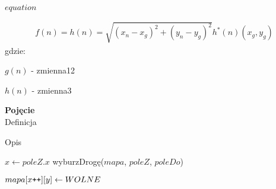 $equation$

\begin{gather}
 	f(n) = h(n) = \sqrt{(x_n - x_g)^2 + (y_n - y_g)^2} h^*(n) (x_g, y_g)
 	\label{eq_astar} 
\end{gather}
 gdzie:

 $g(n)$ - zmienna12

 $h(n)$ - zmienna3

\begin{definition}{\bf Pojęcie\\}
	Definicja
\end{definition}

\begin{algorithm}[H]
  \caption{Opis}\label{alg:ddd}
  \begin{algorithmic}[1]
\STATE $x \gets poleZ.x$
 wyburzDrogę($mapa$, $poleZ$, $poleDo$)
	\begin{ALC@g}
		\STATE $mapa[x\verb-++-][y] \gets WOLNE$ 
	\ENDWHILE
	\end{ALC@g}
	\end{algorithmic}
\end{algorithm}

